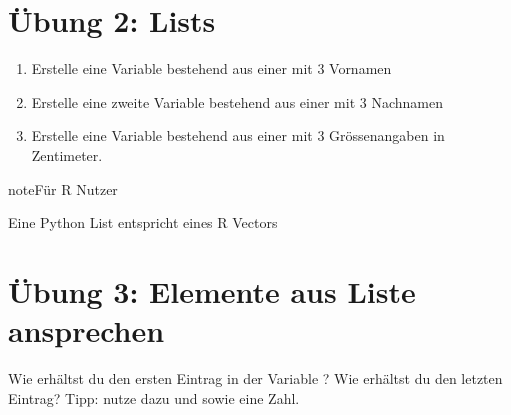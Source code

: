 \documentclass[letterpaper,10pt,english]{sphinxmanual}
\begin{document}
\section{Übung 2: Lists}
\label{\detokenize{01_02_Python_Basics:ubung-2-lists}}\begin{enumerate}
%
\item {} 
Erstelle eine Variable  bestehend aus einer  mit 3 Vornamen

\item {} 
Erstelle eine zweite Variable  bestehend aus einer  mit 3 Nachnamen

\item {} 
Erstelle eine Variable  bestehend aus einer  mit 3 Grössenangaben in Zentimeter.

\end{enumerate}

\begin{sphinxadmonition}{note}{Für R Nutzer}

Eine Python List entspricht eines R Vectors
\end{sphinxadmonition}

\begin{sphinxVerbatim}[commandchars=\\\{\}]
  \PYG{p}{[}  \PYG{p}{]}
  \PYG{p}{[} \PYG{p}{]}

  \PYG{p}{[}  \PYG{p}{]}
\end{sphinxVerbatim}


\section{Übung 3: Elemente aus Liste ansprechen}
\label{\detokenize{01_02_Python_Basics:ubung-3-elemente-aus-liste-ansprechen}}
Wie erhältst du den ersten Eintrag in der Variable ? Wie erhältst du den letzten Eintrag? Tipp: nutze dazu \sphinxcode{\sphinxupquote{{[}}} und \sphinxcode{\sphinxupquote{{]}}} sowie eine Zahl.
\end{document}
